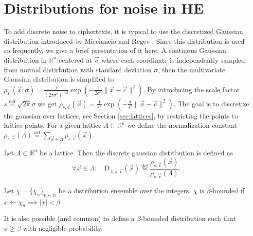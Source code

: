 \section{Distributions for noise in HE}
To add discrete noise to ciphertexts, it is typical to use the discretized Gaussian distribution introduced by Micciancio and Regev \cite{disc-gauss}. Since this distribution is used so frequently, we give a brief presentation of it here. A continous Gaussian distribution in $\mathbb{R}^n$ centered at $\vec{c}$ where each coordinate is independently sampled from normal distirbution with standard deviation $\sigma$, then the multivariate Gaussian distribution is simplified to $\rho_{\vec{c}}(\vec{x}; \sigma)=\frac{1}{\left(2 \pi \sigma^2\right)^{n / 2}} \exp \left(-\frac{1}{2 \sigma^2} \| \vec{x}-\vec{c} \| ^2\right)$. By introducing the scale factor $s \stackrel{\mathrm{def}}{=} \sqrt{2\pi}\sigma$ we get $\rho_{s, \vec{c}}(\vec{x})=\frac{1}{s^n} \exp \left(-\frac{\pi}{s^2} \| \vec{x}-\vec{c} \| ^2\right)$.
The goal is to discretize the gaussian over lattices, see Section \ref{sec:lattices}, by restricting the points to lattice points. For a given lattice $\Lambda \subset \mathbb{R}^n$ we define the normalization constant $\rho_{s, \vec{c}}(\Lambda) \stackrel{\mathrm{def}}{=} \sum_{\vec{x} \in \Lambda} \rho_{s, \vec{c}}(\vec{x})$.
\begin{definition}\label{Disc-Gauss}
    Let $\Lambda \subset \mathbb{R}^n$ be a lattice. Then the discrete gaussian distribution is defined as
    \begin{equation*}
        \forall \vec{x} \in \Lambda \colon \quad \textrm{D}_{\Lambda, s, \vec{c}}(\vec{x}) \stackrel{\mathrm{def}}{=} \frac{\rho_{s, \vec{c}}(\vec{x})}{\rho_{s, \vec{c}}(\Lambda)}.
    \end{equation*}            
\end{definition}
\begin{definition}
    Let $\chi = \{\chi_n\}_{n\in \mathbb{N}}$ be a distribution ensemble over the integers. $\chi$ is $\beta$-bounded if $x \leftarrow \chi_n \implies |x| < \beta$
\end{definition}
\begin{remark}
    It is also possible (and common) to define a $\beta$-bounded distribution such that $x \geq \beta$ with negligible probability.
\end{remark}

